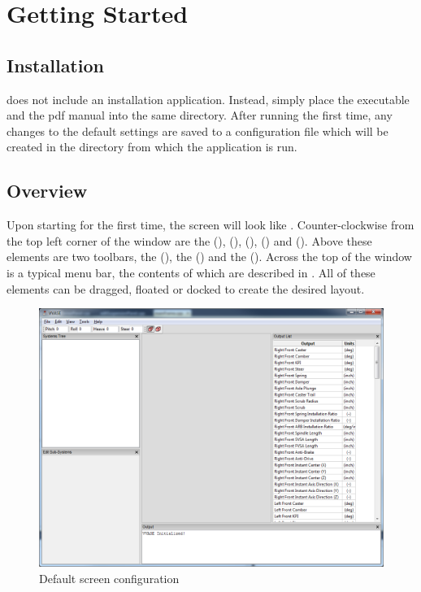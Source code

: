 \chapter{Getting Started} \label{ch:gettingStarted}

\section{Installation} \label{sec:installation}

\vvase{} does not include an installation application.  Instead, simply place the executable and the pdf manual into the same directory.  After running the first time, any changes to the default settings are saved to a configuration file which will be created in the directory from which the application is run.

\section{Overview} \label{sec:overview}

Upon starting \vvase{} for the first time, the screen will look like .  Counter-clockwise from the top left corner of the window are the  (),  (),  (),  () and  ().  Above these elements are two toolbars, the  (), the  () and the  ().  Across the top of the window is a typical menu bar, the contents of which are described in .  All of these elements can be dragged, floated or docked to create the desired layout.

\begin{figure}
  \includegraphics[width=\textwidth]{images/defaultStartup}
  \caption{Default screen configuration} \label{fig:defaultStartup}
  \centering
\end{figure}

